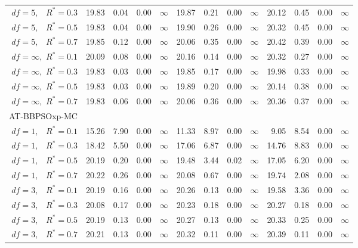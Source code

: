 \documentclass[12pt]{article}
\begin{document}
\begin{table}[ht]
{\begin{tabular}{r|rrrr|rrrr|rrrr}
  $df = 5,\enspace$ $R^* =0.3$ & 19.83 & 0.04 & 0.00 & $\infty$ & 19.87 & 0.21 & 0.00 & $\infty$ & 20.12 & 0.45 & 0.00 & $\infty$ \\ 
  $df = 5,\enspace$ $R^* =0.5$ & 19.83 & 0.04 & 0.00 & $\infty$ & 19.90 & 0.26 & 0.00 & $\infty$ & 20.32 & 0.45 & 0.00 & $\infty$ \\ 
  $df = 5,\enspace$ $R^* =0.7$ & 19.85 & 0.12 & 0.00 & $\infty$ & 20.06 & 0.35 & 0.00 & $\infty$ & 20.42 & 0.39 & 0.00 & $\infty$ \\ 
  $df = \infty,$ $R^* =0.1$ & 20.09 & 0.08 & 0.00 & $\infty$ & 20.16 & 0.14 & 0.00 & $\infty$ & 20.32 & 0.27 & 0.00 & $\infty$ \\ 
  $df = \infty,$ $R^* =0.3$ & 19.83 & 0.03 & 0.00 & $\infty$ & 19.85 & 0.17 & 0.00 & $\infty$ & 19.98 & 0.33 & 0.00 & $\infty$ \\ 
  $df = \infty,$ $R^* =0.5$ & 19.83 & 0.03 & 0.00 & $\infty$ & 19.89 & 0.20 & 0.00 & $\infty$ & 20.14 & 0.38 & 0.00 & $\infty$ \\ 
  $df = \infty,$ $R^* =0.7$ & 19.83 & 0.06 & 0.00 & $\infty$ & 20.06 & 0.36 & 0.00 & $\infty$ & 20.36 & 0.37 & 0.00 & $\infty$ \\ 
\hline
\multicolumn{1}{l|}{AT-BBPSOxp-MC} &&&&&&&&&&&&\\
  $df = 1,\enspace$ $R^* =0.1$ & 15.26 & 7.90 & 0.00 & $\infty$ & 11.33 & 8.97 & 0.00 & $\infty$ & 9.05 & 8.54 & 0.00 & $\infty$ \\ 
  $df = 1,\enspace$ $R^* =0.3$ & 18.42 & 5.50 & 0.00 & $\infty$ & 17.06 & 6.87 & 0.00 & $\infty$ & 14.76 & 8.83 & 0.00 & $\infty$ \\ 
  $df = 1,\enspace$ $R^* =0.5$ & 20.19 & 0.20 & 0.00 & $\infty$ & 19.48 & 3.44 & 0.02 & $\infty$ & 17.05 & 6.20 & 0.00 & $\infty$ \\ 
  $df = 1,\enspace$ $R^* =0.7$ & 20.22 & 0.26 & 0.00 & $\infty$ & 20.08 & 0.67 & 0.00 & $\infty$ & 19.74 & 2.08 & 0.00 & $\infty$ \\ 
  $df = 3,\enspace$ $R^* =0.1$ & 20.19 & 0.16 & 0.00 & $\infty$ & 20.26 & 0.13 & 0.00 & $\infty$ & 19.58 & 3.36 & 0.00 & $\infty$ \\ 
  $df = 3,\enspace$ $R^* =0.3$ & 20.08 & 0.17 & 0.00 & $\infty$ & 20.23 & 0.18 & 0.00 & $\infty$ & 20.27 & 0.18 & 0.00 & $\infty$ \\ 
  $df = 3,\enspace$ $R^* =0.5$ & 20.19 & 0.13 & 0.00 & $\infty$ & 20.27 & 0.13 & 0.00 & $\infty$ & 20.33 & 0.25 & 0.00 & $\infty$ \\ 
  $df = 3,\enspace$ $R^* =0.7$ & 20.21 & 0.13 & 0.00 & $\infty$ & 20.32 & 0.11 & 0.00 & $\infty$ & 20.39 & 0.11 & 0.00 & $\infty$ \\ 

\end{tabular}}
\end{table}
\end{document}
